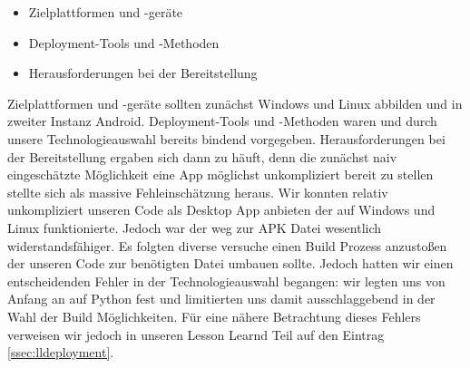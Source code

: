 		\begin{itemize}
			\item Zielplattformen und -geräte
			\item Deployment-Tools und -Methoden
			\item Herausforderungen bei der Bereitstellung
		\end{itemize}
		
		\noindent Zielplattformen und -geräte sollten zunächst Windows und Linux abbilden und in zweiter Instanz Android. Deployment-Tools und -Methoden waren und durch unsere Technologieauswahl bereits bindend vorgegeben. Herausforderungen bei der Bereitstellung ergaben sich dann zu häuft, denn die zunächst naiv eingeschätzte Möglichkeit eine App möglichst unkompliziert bereit zu stellen stellte sich als massive Fehleinschätzung heraus. Wir konnten relativ unkompliziert unseren Code als Desktop App anbieten der auf Windows und Linux funktionierte. Jedoch war der weg zur APK Datei wesentlich widerstandsfähiger. Es folgten diverse versuche einen Build Prozess anzustoßen der unseren Code zur benötigten Datei umbauen sollte. Jedoch hatten wir einen entscheidenden Fehler in der Technologieauswahl begangen: wir legten uns von Anfang an auf Python fest und limitierten uns damit ausschlaggebend in der Wahl der Build Möglichkeiten. Für eine nähere Betrachtung dieses Fehlers verweisen wir jedoch in unseren Lesson Learnd Teil auf den Eintrag \ref{ssec:lldeployment}.
